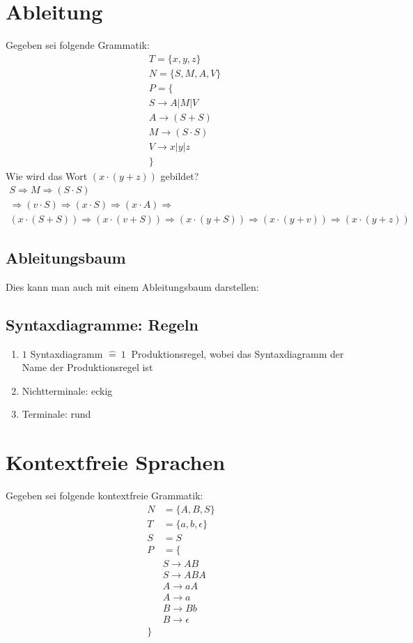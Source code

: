 \documentclass[12pt, oneside]{book}
\begin{document}
\section{Ableitung}
Gegeben sei folgende Grammatik:
\begin{align*}
    &T=\{x,y,z\}\\
    &N=\{S, M, A, V\}\\
    &P=\{\\
    &S\rightarrow A|M|V\\
    &A\rightarrow (S+S)\\
    &M\rightarrow (S\cdot S)\\
    &V\rightarrow x|y|z\\
    &\}
\end{align*}
Wie wird das Wort $(x\cdot (y+z))$ gebildet?
\begin{align*}
    S\Rightarrow M\Rightarrow (S\cdot S)\\
    \Rightarrow (v\cdot S)\Rightarrow (x\cdot S)\Rightarrow (x\cdot A)\Rightarrow\\ (x\cdot (S+S))\Rightarrow (x\cdot (v + S))\Rightarrow (x\cdot (y + S))\Rightarrow (x\cdot (y + v))\Rightarrow (x\cdot (y + z))
\end{align*}
\subsection{Ableitungsbaum}
Dies kann man auch mit einem Ableitungsbaum darstellen:
\subsection{Syntaxdiagramme: Regeln}
\begin{enumerate}
    \item $1$ Syntaxdiagramm $\hat{=}\ 1\ $ Produktionsregel, wobei das Syntaxdiagramm der Name der Produktionsregel ist
    \item Nichtterminale: eckig
    \item Terminale: rund
\end{enumerate}

\section{Kontextfreie Sprachen}
Gegeben sei folgende kontextfreie Grammatik:
\begin{align*}
    N&=\{A,B,S\}\\
    T&=\{a,b,\epsilon\}\\
    S&=S\\
    P&=\{\\
        &S\to AB\\
        &S\to ABA\\
        &A\to aA\\
        &A\to a\\
        &B\to Bb\\
        &B\to \epsilon\\
        \}
    \end{align*}
\end{document}
